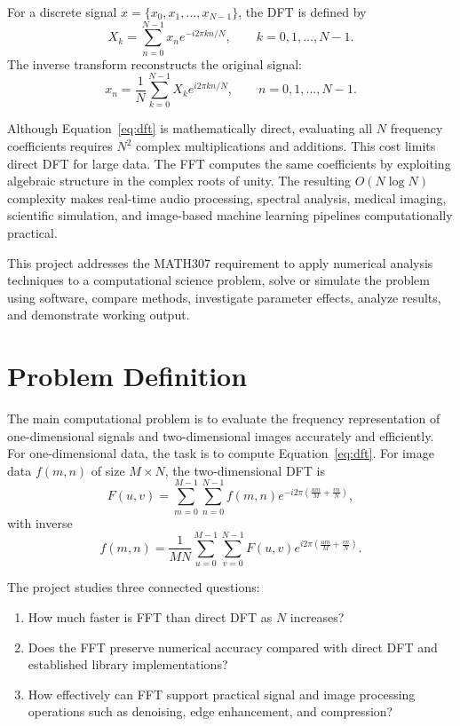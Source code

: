\documentclass{zc-ust-hw}
\begin{document}
For a discrete signal \(x=\{x_0,x_1,\dots,x_{N-1}\}\), the DFT is defined by
\begin{equation}
X_k=\sum_{n=0}^{N-1}x_n e^{-i2\pi kn/N}, \qquad k=0,1,\dots,N-1.
\label{eq:dft}
\end{equation}
The inverse transform reconstructs the original signal:
\begin{equation}
x_n=\frac{1}{N}\sum_{k=0}^{N-1}X_k e^{i2\pi kn/N}, \qquad n=0,1,\dots,N-1.
\label{eq:idft}
\end{equation}

Although Equation~\eqref{eq:dft} is mathematically direct, evaluating all \(N\) frequency coefficients requires \(N^2\) complex multiplications and additions. This cost limits direct DFT for large data. The FFT computes the same coefficients by exploiting algebraic structure in the complex roots of unity. The resulting \(O(N\log N)\) complexity makes real-time audio processing, spectral analysis, medical imaging, scientific simulation, and image-based machine learning pipelines computationally practical.

This project addresses the MATH307 requirement to apply numerical analysis techniques to a computational science problem, solve or simulate the problem using software, compare methods, investigate parameter effects, analyze results, and demonstrate working output.

\section{Problem Definition}
The main computational problem is to evaluate the frequency representation of one-dimensional signals and two-dimensional images accurately and efficiently. For one-dimensional data, the task is to compute Equation~\eqref{eq:dft}. For image data \(f(m,n)\) of size \(M\times N\), the two-dimensional DFT is
\begin{equation}
F(u,v)=\sum_{m=0}^{M-1}\sum_{n=0}^{N-1}
f(m,n)e^{-i2\pi\left(\frac{um}{M}+\frac{vn}{N}\right)},
\label{eq:2ddft}
\end{equation}
with inverse
\begin{equation}
f(m,n)=\frac{1}{MN}\sum_{u=0}^{M-1}\sum_{v=0}^{N-1}
F(u,v)e^{i2\pi\left(\frac{um}{M}+\frac{vn}{N}\right)}.
\label{eq:2didft}
\end{equation}

The project studies three connected questions:
\begin{enumerate}
    \item How much faster is FFT than direct DFT as \(N\) increases?
    \item Does the FFT preserve numerical accuracy compared with direct DFT and established library implementations?
    \item How effectively can FFT support practical signal and image processing operations such as denoising, edge enhancement, and compression?
\end{enumerate}
\end{document}
